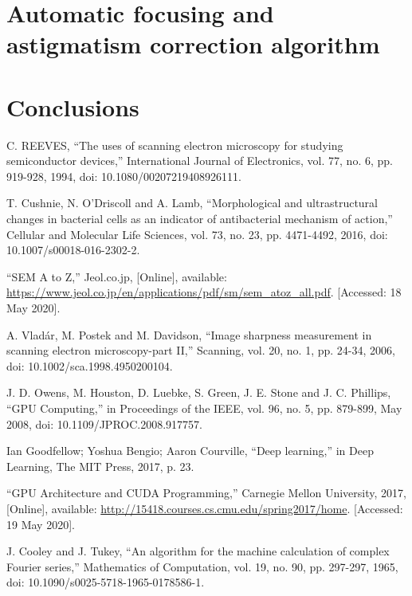 \documentclass[12pt, twocolumn]{report}
\begin{document}
\chapter{Automatic focusing and astigmatism correction algorithm}

\chapter{Conclusions}

\begin{thebibliography}{00}
    C. REEVES, ``The uses of scanning electron microscopy for studying semiconductor devices,'' International Journal of Electronics, vol. 77, no. 6, pp. 919-928, 1994, doi: 10.1080/00207219408926111.

    T. Cushnie, N. O’Driscoll and A. Lamb, ``Morphological and ultrastructural changes in bacterial cells as an indicator of antibacterial mechanism of action,'' Cellular and Molecular Life Sciences, vol. 73, no. 23, pp. 4471-4492, 2016, doi: 10.1007/s00018-016-2302-2.

    ``SEM A to Z,'' Jeol.co.jp, [Online], available: \url{https://www.jeol.co.jp/en/applications/pdf/sm/sem_atoz_all.pdf}. [Accessed: 18 May 2020].

    A. Vladár, M. Postek and M. Davidson, ``Image sharpness measurement in scanning electron microscopy-part II,'' Scanning, vol. 20, no. 1, pp. 24-34, 2006, doi: 10.1002/sca.1998.4950200104.

    J. D. Owens, M. Houston, D. Luebke, S. Green, J. E. Stone and J. C. Phillips, ``GPU Computing,'' in Proceedings of the IEEE, vol. 96, no. 5, pp. 879-899, May 2008, doi: 10.1109/JPROC.2008.917757.

    Ian Goodfellow; Yoshua Bengio; Aaron Courville, ``Deep learning,'' in Deep Learning, The MIT Press, 2017, p. 23.

    ``GPU Architecture and CUDA Programming,'' Carnegie Mellon University, 2017, [Online], available: \url{http://15418.courses.cs.cmu.edu/spring2017/home}. [Accessed: 19 May 2020].

    J. Cooley and J. Tukey, ``An algorithm for the machine calculation of complex Fourier series,'' Mathematics of Computation, vol. 19, no. 90, pp. 297-297, 1965, doi: 10.1090/s0025-5718-1965-0178586-1.


\end{thebibliography}
\end{document}
